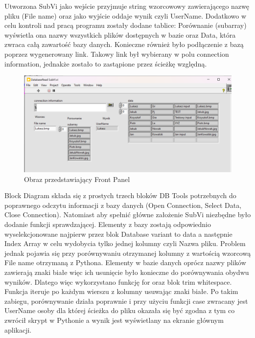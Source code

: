 \documentclass{report}
\begin{document}
Utworzona SubVi jako wejście przyjmuje string wzorcowowy zawierającego nazwę pliku (File name) oraz jako wyjście oddaje wynik czyli UserName.
Dodatkowo w celu kontroli nad pracą programu zostały dodane tablice: Porównanie (subarray) wyświetla ona nazwy wszystkich plików dostępnych w bazie oraz Data, która zwraca
całą zawartość bazy danych. Konieczne również było podłączenie z bazą poprzez wygenerowany link. Takowy link był wybierany w polu connection information, 
jednakże zostało to zastąpione przez ścieżkę względną.

\begin{figure}[H]
    \centering
    \includegraphics[width=1.0\textwidth]{src/Database/Database_read_subvi_frontpanel.png}
    \caption{Obraz przedstawiający Front Panel }
    \label{fig:first-att}
\end{figure}

Block Diagram składa się z prostych trzech bloków DB Tools potrzebnych do poprawnego odczytu informacji z bazy danych (Open Connection, Select Data, Close Connection).
Natomiast aby spełnić główne założenie SubVi niezbędne było dodanie funkcji sprawdzającej.
Elementy z bazy zostają odpowiednio wyselekcjonowane najpierw przez blok Database variant to data a następnie Index Array w celu wydobycia tylko jednej kolumny czyli Nazwa pliku.
Problem jednak pojawia się przy porównywaniu otrzymanej kolumny z wartością wzorcową File name otrzymaną z Pythona. Elementy w bazie danych oprócz nazwy plików zawierają znaki białe więc ich
usunięcie było konieczne do porównywania obydwu wyników. Dlatego więc wykorzystano funkcję for oraz blok trim whitespace. Funkcja iteruje po każdym wierszu z kolumny usuwając znaki białe.
Po takim zabiegu, porównywanie działa poprawnie i przy użyciu funkcji case zwracany jest UserName osoby dla której ścieżka do pliku okazała się być zgodna z tym co zwrócił skrypt w Pythonie a
wynik jest wyświetlany na ekranie głównym aplikacji.
\end{document}
